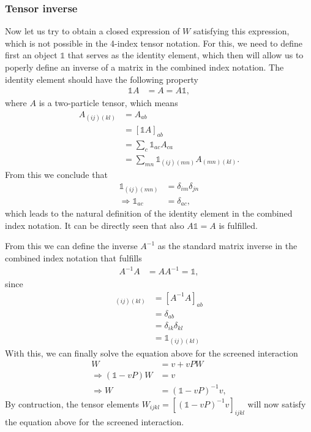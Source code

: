 \documentclass[12pt,a4paper]{scrartcl}
\numberwithin{equation}{section}
\newcommand{\unity}{\mathds{1}}
\begin{document}
\subsubsection{Tensor inverse}

Now let us try to obtain a closed expression of $W$ satisfying this expression, which
is not possible in the 4-index tensor notation.
For this, we need to define first an object $\unity$ that serves as the identity element, which then will
allow us to poperly define an inverse of a matrix in the combined index notation.
The identity element should have the following property
\begin{align}
 \unity A &= A =  A \unity ,
\end{align}
where $A$ is a two-particle tensor, which means
\begin{align}
A_{(ij)(kl)} &= A_{ab} \\
&= [\unity A]_{ab} \\
&= \sum_c \unity_{ac} A_{ca} \\
&= \sum_{mn} \unity_{(ij)(mn)} A_{(mn)(kl)} .
\end{align}
From this we conclude that 
\begin{align}
 \unity_{(ij)(mn)} &= \delta_{im}\delta_{jn} \\
 \Rightarrow \unity_{ac} &= \delta_{ac},
\end{align}
which leads to the natural definition of the identity element in the combined index notation.
It can be directly seen that also $ A \unity = A$ is fulfilled.

From this we can define the inverse $A^{-1}$ as the standard matrix inverse in the combined index notation
that fulfills
\begin{align}
A^{-1}A &= AA^{-1} = \unity,
\end{align}
since
\begin{align}
[A^{-1}A]_{(ij)(kl)} &= [A^{-1}A]_{ab} \\
&= \delta_{ab} \\
&= \delta_{ik}\delta_{kl} \\
&= \unity_{(ij)(kl)}
\end{align}
With this, we can finally solve the equation above for the screened interaction
\begin{align}
 W &= v + vPW \\
 \Rightarrow (\unity - vP) W &= v \\
 \Rightarrow  W &=(\unity - vP)^{-1} v ,
\end{align}
By contruction, the tensor elements $W_{ijkl} =[(\unity - vP)^{-1} v]_{ijkl}$
will now satisfy the equation above for the screened interaction.
\end{document}
